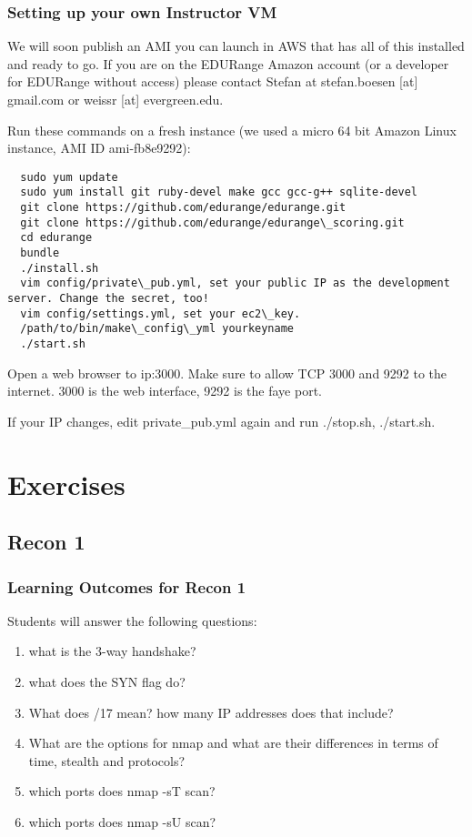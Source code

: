 \documentclass[11pt]{report}
\begin{document}
\subsubsection*{Setting up your own Instructor VM}
We will soon publish an AMI you can launch in AWS that has all of this installed and ready to go. If you are 
on the EDURange Amazon account (or a developer for EDURange without access) please contact Stefan at 
stefan.boesen [at] gmail.com or weissr [at] evergreen.edu.

Run these commands on a fresh instance (we used a micro 64 bit Amazon Linux instance, AMI ID ami-fb8e9292):

\begin{verbatim}
  sudo yum update
  sudo yum install git ruby-devel make gcc gcc-g++ sqlite-devel
  git clone https://github.com/edurange/edurange.git
  git clone https://github.com/edurange/edurange\_scoring.git
  cd edurange
  bundle
  ./install.sh
  vim config/private\_pub.yml, set your public IP as the development server. Change the secret, too!
  vim config/settings.yml, set your ec2\_key.
  /path/to/bin/make\_config\_yml yourkeyname
  ./start.sh
\end{verbatim}

Open a web browser to ip:3000. Make sure to allow TCP 3000 and 9292 to the internet. 
3000 is the web interface, 9292 is the faye port.

If your IP changes, edit private\_pub.yml again and run ./stop.sh, ./start.sh.

\section{Exercises}

\subsection{Recon 1}
\subsubsection{Learning Outcomes for Recon 1}
Students will answer the following questions:
\begin{enumerate}
   \item what is the 3-way handshake?
   \item what does the SYN flag do?
   \item What does /17 mean?  how many IP addresses does that include?
   \item What are the options for nmap and what are their differences in terms of time, stealth and
   protocols?
   \item which ports does nmap -sT scan?
   \item which ports does nmap -sU scan?
\end{enumerate}
\end{document}
